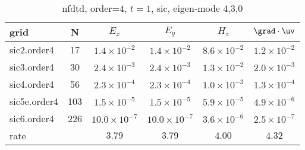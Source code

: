 \begin{table}[hbt]
\begin{center}
\begin{tabular}{|l|c|c|c|c|c|} \hline\hline 
grid  & N &  $E_x$ &  $E_y$ & $H_z$ & $\grad\cdot\uv$\\ \hline 
         sic2.order4 &    17 &  $1.4\times10^{ -2}$  &  $1.4\times10^{ -2}$  &  $8.6\times10^{ -2}$  &  $1.2\times10^{ -2}$   \\ \hline
         sic3.order4 &    30 &  $2.4\times10^{ -3}$  &  $2.4\times10^{ -3}$  &  $1.3\times10^{ -2}$  &  $2.0\times10^{ -3}$   \\ \hline
         sic4.order4 &    56 &  $2.3\times10^{ -4}$  &  $2.3\times10^{ -4}$  &  $1.0\times10^{ -3}$  &  $1.3\times10^{ -4}$   \\ \hline
        sic5e.order4 &   103 &  $1.5\times10^{ -5}$  &  $1.5\times10^{ -5}$  &  $5.9\times10^{ -5}$  &  $4.9\times10^{ -6}$   \\ \hline
         sic6.order4 &   226 &  $10.0\times10^{ -7}$  &  $10.0\times10^{ -7}$  &  $3.6\times10^{ -6}$  &  $2.5\times10^{ -7}$   \\ \hline
    rate            &     &       $3.79$ &       $3.79$ &       $4.00$ &       $4.32$  \\ \hline\hline
\end{tabular}
\caption{nfdtd, order=$4$, $t=1$, sic, eigen-mode 4,3,0}\label{table:mx.sic}
\end{center}
\end{table}

